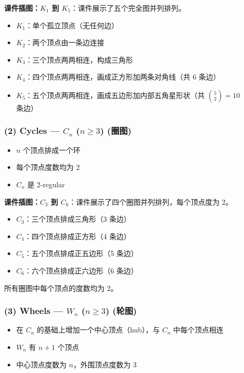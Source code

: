 \documentclass[10pt,a4paper,openany]{ctexbook}
\theoremstyle{definition}
\theoremstyle{remark}
\begin{document}
\textbf{课件插图：$K_1$ 到 $K_5$}：课件展示了五个完全图并列排列。
\begin{itemize}
\item $K_1$：单个孤立顶点（无任何边）
\item $K_2$：两个顶点由一条边连接
\item $K_3$：三个顶点两两相连，构成三角形
\item $K_4$：四个顶点两两相连，画成正方形加两条对角线（共 6 条边）
\item $K_5$：五个顶点两两相连，画成五边形加内部五角星形状（共 $\binom{5}{2}=10$ 条边）

\end{itemize}

\subsubsection{(2) Cycles — $C_n$ ($n \ge 3$) (圈图)}

\begin{itemize}
\item $n$ 个顶点排成一个环
\item 每个顶点度数均为 2
\item $C_n$ 是 2-regular

\end{itemize}

\textbf{课件插图：$C_3$ 到 $C_6$}：课件展示了四个圈图并列排列，每个顶点度为 2。
\begin{itemize}
\item $C_3$：三个顶点排成三角形（3 条边）
\item $C_4$：四个顶点排成正方形（4 条边）
\item $C_5$：五个顶点排成正五边形（5 条边）
\item $C_6$：六个顶点排成正六边形（6 条边）
\end{itemize}

所有圈图中每个顶点的度数均为 2。
\subsubsection{(3) Wheels — $W_n$ ($n \ge 3$) (轮图)}

\begin{itemize}
\item 在 $C_n$ 的基础上增加一个中心顶点（hub），与 $C_n$ 中每个顶点相连
\item $W_n$ 有 $n+1$ 个顶点
\item 中心顶点度数为 $n$，外围顶点度数为 3

\end{itemize}
\end{document}
